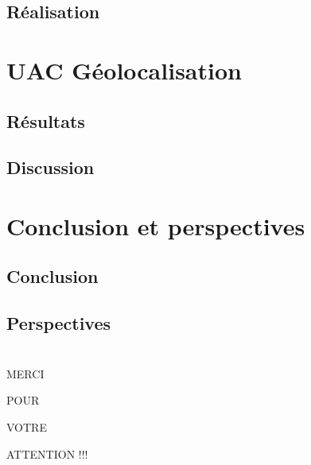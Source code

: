 \documentclass[11pt]{beamer}
\begin{document}
		\subsection{Réalisation}
			\begin{frame}
			
			\end{frame}
		
	\section{UAC Géolocalisation}
		\subsection{Résultats}
			\begin{frame}
			
			\end{frame}
		\subsection{Discussion}
			\begin{frame}
			
			\end{frame}
	\section{Conclusion et perspectives}
		\subsection{Conclusion}
			\begin{frame}
			
			\end{frame}
		\subsection{Perspectives}
			\begin{frame}
			
			\end{frame}

\section*{}
    \begin{frame}
	\begin{center}
		\begin{Huge}
		      \begin{center}
		       MERCI
		      \end{center}
		       \begin{center}
		       POUR
		      \end{center}
		      \begin{center}
		       VOTRE
		      \end{center}
		      \begin{center}
		       ATTENTION !!!
		      \end{center}
		\end{Huge}
	\end{center}
\end{frame}

\end{document}
